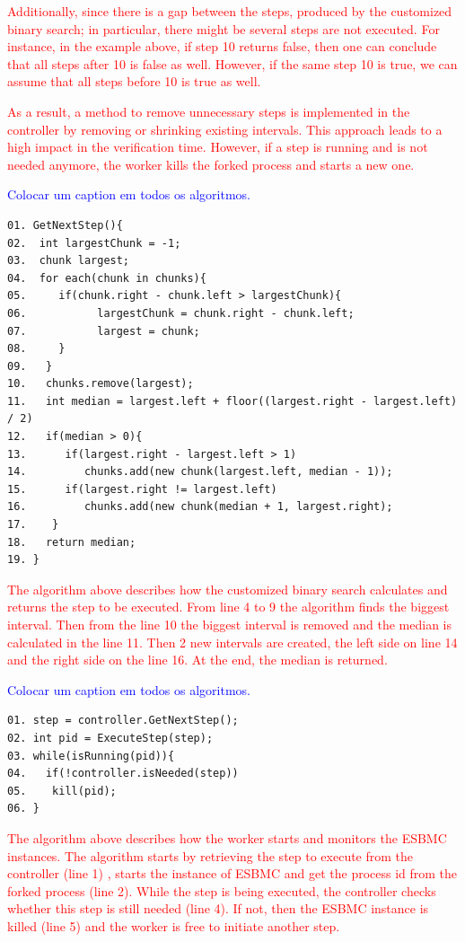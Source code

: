 \textcolor{Red}{Additionally, since there is a gap between the steps, produced by the customized binary search; in particular, there might be several steps are not executed. For instance, in the example above, if step 10 returns false, then one can conclude that all steps after 10 is false as well. However, if the same step 10 is true, we can assume that all steps before 10 is true as well.}

\textcolor{Red}{As a result, a method to remove unnecessary steps is implemented in the controller by removing or shrinking existing intervals. This approach leads to a high impact in the verification time. However, if a step is running and is not needed anymore, the worker kills the forked process and starts a new one.}

\textcolor{blue}{Colocar um caption em todos os algoritmos.}

\begin{lstlisting}[caption=Steps Calculation using Intervals]
01. GetNextStep(){
02.  int largestChunk = -1;
03.  chunk largest;
04.  for each(chunk in chunks){
05.     if(chunk.right - chunk.left > largestChunk){
06.           largestChunk = chunk.right - chunk.left;
07.           largest = chunk;
08.     }
09.   }	
10.   chunks.remove(largest);	
11.   int median = largest.left + floor((largest.right - largest.left) / 2)
12.   if(median > 0){
13.      if(largest.right - largest.left > 1)
14.         chunks.add(new chunk(largest.left, median - 1));	
15.      if(largest.right != largest.left)
16.         chunks.add(new chunk(median + 1, largest.right);
17.    }
18.   return median;
19. }
\end{lstlisting}
\textcolor{Red}{The algorithm above describes how the customized binary search calculates and returns the step to be executed. From line 4 to 9 the algorithm finds the biggest interval. Then from the line 10 the biggest interval is removed and the median is calculated in the line 11. Then 2 new intervals are created, the left side on line 14 and the right side on the line 16. At the end, the median is returned.}

\textcolor{blue}{Colocar um caption em todos os algoritmos.}

\begin{lstlisting}[caption=Worker sample]
01. step = controller.GetNextStep();
02. int pid = ExecuteStep(step);
03. while(isRunning(pid)){
04.   if(!controller.isNeeded(step))
05.    kill(pid);
06. }     
\end{lstlisting}
\textcolor{Red}{The algorithm above describes how the worker starts and monitors the ESBMC instances. The algorithm starts by retrieving the step to execute from the controller (line 1) , starts the instance of ESBMC and get the process id from the forked process (line 2). While the step is being executed, the controller checks whether this step is still needed (line 4). If not, then the ESBMC instance is killed (line 5) and the worker is free to initiate another step.}

